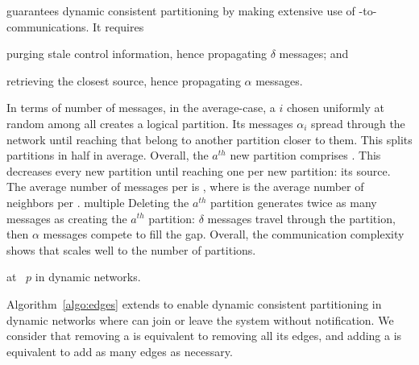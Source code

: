 \NAME guarantees dynamic consistent partitioning by making extensive
use of \process-to-\process communications. It requires
\begin{inparaenum}[(i)]
\item purging stale control information, hence propagating $\delta$
  messages; and
\item retrieving the closest source, hence propagating $\alpha$
  messages.
\end{inparaenum}
In terms of number of messages, in the average-case, a \process $i$
chosen uniformly at random among all \processes creates a logical
partition. Its messages $\alpha_i$ spread through the network until
reaching \processes that belong to another partition closer to
them. This splits partitions in half in average. Overall, the $a^{th}$
new partition comprises  \processes. This decreases every new
partition until reaching one \process per new partition: its
source. The average number of messages per \process is
, where  is the average
number of neighbors per \process. %
multiple
Deleting the $a^{th}$ partition generates twice as many messages as
creating the $a^{th}$ partition: $\delta$ messages travel through the
partition, then $\alpha$ messages compete to fill the gap.  Overall,
the communication complexity shows that \NAME scales well to the
number of partitions.

\begin{algorithm}
  
  \caption{\label{algo:edges}\NAME at \Process~$p$ in dynamic networks.}
\end{algorithm}

Algorithm~\ref{algo:edges} extends \NAME to enable dynamic consistent
partitioning in dynamic networks where \processes can join or leave
the system without notification. We consider that removing a \process
is equivalent to removing all its edges, and adding a \process is
equivalent to add as many edges as necessary.


